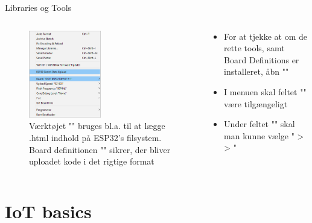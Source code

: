\documentclass[aspectratio=169]{beamer}
\begin{document}
\begin{frame}{Libraries og Tools}
\begin{columns}
	\begin{column}{0.5\textwidth}
			\begin{figure}
  					\includegraphics[width=0.5\textwidth]{assets/pictures/sketch-data-and-board.png}
  					\caption{Værktøjet "" bruges bl.a. til at lægge .html indhold på ESP32's filsystem. Board definitionen "" sikrer, der bliver uploadet kode i det rigtige format}
  					\label{fig:sketch-data-and-board}
  			\end{figure}
	\end{column}
	\begin{column}{0.5\textwidth}
		\begin{textBox}
			\begin{itemize}
				\item For at tjekke at om de rette tools, samt Board Definitions er installeret, åbn ""
				\item I menuen skal feltet "" være tilgængeligt
				\item Under feltet "" skal man kunne vælge " >  > "
			\end{itemize}
		\end{textBox}
	\end{column}
\end{columns}
\end{frame}

\section{IoT basics}
\begin{frame}
\end{frame}
\end{document}
